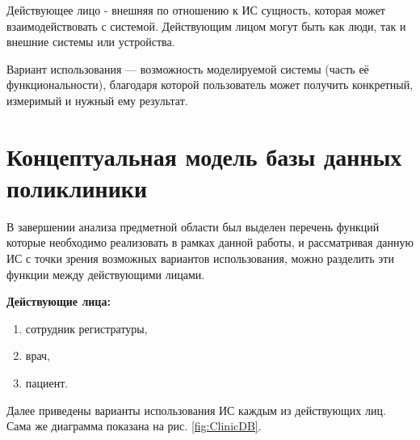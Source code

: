 \documentclass[14pt,a4paper,russian]{extreport}
\begin{document}
Действующее лицо - внешняя по отношению к ИС сущность, которая может
взаимодействовать с системой. Действующим лицом могут быть как люди, так и внешние системы или
устройства.\par
Вариант использования — возможность моделируемой системы (часть её функциональности), благодаря которой
пользователь может получить конкретный, измеримый и нужный ему результат. \cite{dbdesign}


\section{Концептуальная модель базы данных поликлиники}
В завершении анализа предметной области был выделен перечень функций которые необходимо реализовать
в рамках данной работы, и рассматривая данную ИС с точки зрения возможных вариантов использования, можно 
разделить эти функции между действующими лицами.\par
\noindent\textbf{Действующие лица:}
\begin{enumerate}[noitemsep]
    \item сотрудник регистратуры,
    \item врач,
    \item пациент.    
\end{enumerate}
Далее приведены варианты использования ИС каждым из действующих лиц. Сама же диаграмма показана на
рис. \ref{fig:ClinicDB}.
\end{document}

